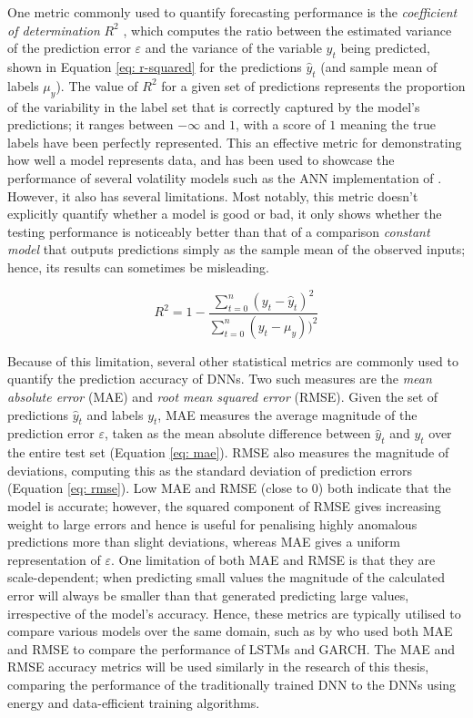 \documentclass[a4paper, 11pt]{report}
\begin{document}
    One metric commonly used to quantify forecasting performance is the \emph{coefficient of determination} $R^2$ \citep{zhang-2022}, which computes the ratio between the estimated variance of the prediction error $\varepsilon$ and the variance of the variable $y_t$ being predicted, shown in Equation \ref{eq: r-squared} for the predictions $\hat{y}_t$ (and sample mean of labels $\mu_{y}$). The value of $R^2$ for a given set of predictions represents the proportion of the variability in the label set that is correctly captured by the model's predictions; it ranges between $- \infty$ and $1$, with a score of $1$ meaning the true labels have been perfectly represented. This an effective metric for demonstrating how well a model represents data, and has been used to showcase the performance of several volatility models such as the ANN implementation of \citet{zhang-2022}. However, it also has several limitations. Most notably, this metric doesn't explicitly quantify whether a model is good or bad, it only shows whether the testing performance is noticeably better than that of a comparison \emph{constant model} that outputs predictions simply as the sample mean of the observed inputs; hence, its results can sometimes be misleading.


    \begin{equation}
        \label{eq: r-squared}
        R^2 = 1 - \frac{\sum_{t=0}^n (y_t - \hat{y}_t)^2}{\sum_{t=0}^n (y_t - \mu_{y}))^2}
    \end{equation}


    Because of this limitation, several other statistical metrics are commonly used to quantify the prediction accuracy of DNNs. Two such measures are the \emph{mean absolute error} (MAE) and \emph{root mean squared error} (RMSE). Given the set of predictions $\hat{y}_t$ and labels $y_t$, MAE measures the average magnitude of the prediction error $\varepsilon$, taken as the mean absolute difference between $\hat{y}_t$ and $y_t$ over the entire test set (Equation \ref{eq: mae}). RMSE also measures the magnitude of deviations, computing this as the standard deviation of prediction errors (Equation \ref{eq: rmse}). Low MAE and RMSE (close to $0$) both indicate that the model is accurate; however, the squared component of RMSE gives increasing weight to large errors and hence is useful for penalising highly anomalous predictions more than slight deviations, whereas MAE gives a uniform representation of $\varepsilon$. One limitation of both MAE and RMSE is that they are scale-dependent; when predicting small values the magnitude of the calculated error will always be smaller than that generated predicting large values, irrespective of the model's accuracy. Hence, these metrics are typically utilised to compare various models over the same domain, such as by \citet{rodikov-2022} who used both MAE and RMSE to compare the performance of LSTMs and GARCH. The MAE and RMSE accuracy metrics will be used similarly in the research of this thesis, comparing the performance of the traditionally trained DNN to the DNNs using energy and data-efficient training algorithms. 
\end{document}
